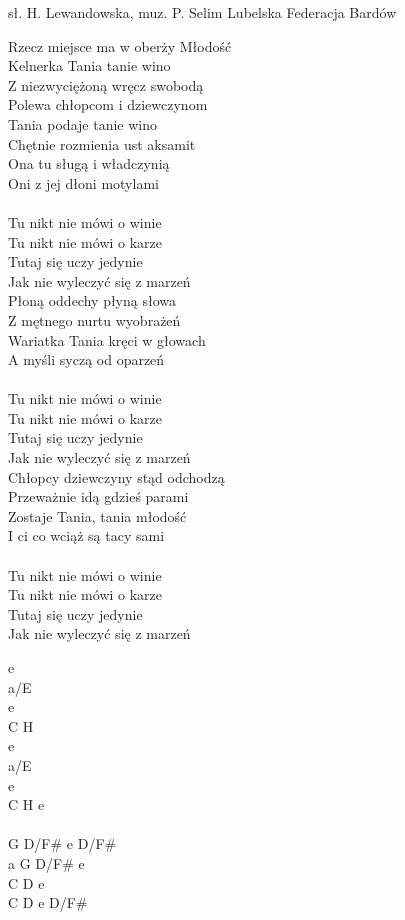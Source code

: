 {sł. H. Lewandowska, muz. P. Selim}
{Lubelska Federacja Bardów}
\begin{text}
Rzecz miejsce ma w oberży Młodość\\
Kelnerka Tania tanie wino\\
Z niezwyciężoną wręcz swobodą\\
Polewa chłopcom i dziewczynom\\

Tania podaje tanie wino\\
Chętnie rozmienia ust aksamit\\
Ona tu sługą i władczynią\\
Oni z jej dłoni motylami\\

\vin [2x]\\
\vin Tu nikt nie mówi o winie\\
\vin Tu nikt nie mówi o karze\\
\vin Tutaj się uczy jedynie\\
\vin Jak nie wyleczyć się z marzeń\\

Płoną oddechy płyną słowa\\
Z mętnego nurtu wyobrażeń\\
Wariatka Tania kręci w głowach\\
A myśli syczą od oparzeń\\

\vin [2x]\\
\vin Tu nikt nie mówi o winie\\
\vin Tu nikt nie mówi o karze\\
\vin Tutaj się uczy jedynie\\
\vin Jak nie wyleczyć się z marzeń\\

Chłopcy dziewczyny stąd odchodzą\\
Przeważnie idą gdzieś parami\\
Zostaje Tania, tania młodość\\
I ci co wciąż są tacy sami\\

\vin [2x]\\
\vin Tu nikt nie mówi o winie\\
\vin Tu nikt nie mówi o karze\\
\vin Tutaj się uczy jedynie\\
\vin Jak nie wyleczyć się z marzeń\\
\end{text}
\begin{chord}
e\\
a/E\\
e\\
C H\\

e\\
a/E\\
e\\
C H e\\

\vin \\
G D/F# e D/F#\\
a G D/F# e\\
C D e\\
C D e D/F#\\
\end{chord}
